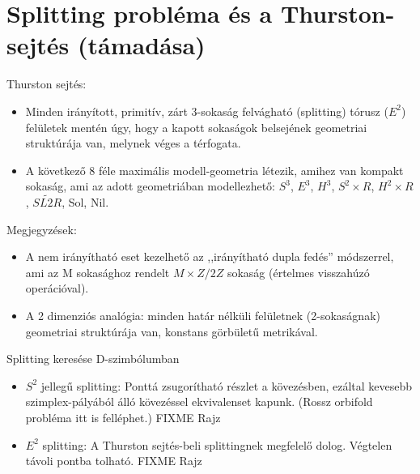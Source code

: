 \section{Splitting probléma és a Thurston-sejtés (támadása)}
\begin{frame}
  Thurston sejtés:
  \begin{itemize}
    \item Minden irányított, primitív, zárt 3-sokaság felvágható (splitting)
      tórusz ($E^2$) felületek mentén úgy, hogy a kapott sokaságok belsejének
      geometriai struktúrája van, melynek véges a térfogata.
    \item A következő 8 féle maximális modell-geometria létezik, amihez van
      kompakt sokaság, ami az adott geometriában modellezhető: $S^3$, $E^3$,
      $H^3$, $S^2\times R$, $H^2\times R$, $\widetilde{SL2R}$, Sol,
      Nil.
  \end{itemize}
  Megjegyzések:
  \begin{itemize}
    \item A nem irányítható eset kezelhető az ,,irányítható dupla fedés''
      módszerrel, ami az M sokasághoz rendelt $M\times Z/2Z$ sokaság
      (értelmes visszahúzó operációval). 
    \item A 2 dimenziós analógia: minden határ nélküli felületnek (2-sokaságnak)
      geometriai struktúrája van, konstans görbületű metrikával.
  \end{itemize}
\end{frame}

\begin{frame}
  Splitting keresése D-szimbólumban
  \begin{itemize}
    \item $S^2$ jellegű splitting: Ponttá zsugorítható részlet a kövezésben,
      ezáltal  kevesebb
      szimplex-pályából álló kövezéssel ekvivalenset kapunk. (Rossz orbifold
      probléma itt is felléphet.)
      FIXME Rajz
    \item $E^2$ splitting: A Thurston sejtés-beli splittingnek megfelelő dolog.
      Végtelen távoli pontba tolható.
      FIXME Rajz
  \end{itemize}
\end{frame}

